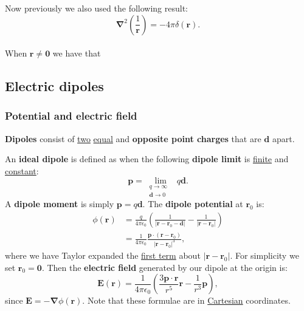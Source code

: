 \documentclass{article}
\begin{document}
Now previously we also used the following result:
$$\boldsymbol{\nabla}^2
\left(\frac{1}{\boldsymbol{r}}\right)
=-4\pi\delta(\boldsymbol{r}).$$ \\

When $\boldsymbol{r}\neq\boldsymbol{0}$ we have that



\newpage

\subsection{Electric dipoles}

\subsubsection{Potential and electric field}
\textbf{Dipoles} consist of \underline{two} \underline{equal} and \textbf{opposite point charges} that are $\boldsymbol{d}$ apart. 

An \textbf{ideal dipole} is defined as when the following \textbf{dipole limit} is \underline{finite} and \underline{constant}:
$$\boldsymbol{p}=\lim_{\begin{smallmatrix} q\to\infty & \\ \boldsymbol{d}\to 0 \end{smallmatrix}} q\boldsymbol{d}.$$
A \textbf{dipole moment} is simply $\boldsymbol{p}=q\boldsymbol{d}$. The \textbf{dipole potential} at $\boldsymbol{r}_0$ is:
\begin{align*}
    \phi(\boldsymbol{r})
    &= \frac{q}{4\pi\epsilon_0}\left(\frac{1}{|\boldsymbol{r}-\boldsymbol{r}_0-\boldsymbol{d}|}-\frac{1}{|\boldsymbol{r}-\boldsymbol{r}_0|}\right)\\
    &=\frac{1}{4\pi\epsilon_0}\frac{\boldsymbol{p}\cdot(\boldsymbol{r}-\boldsymbol{r}_0)}{|\boldsymbol{r}-\boldsymbol{r}_0|^3},
\end{align*}
where we have Taylor expanded the \underline{first term} about $|\boldsymbol{r}-\boldsymbol{r}_0|$. For simplicity we set $\boldsymbol{r}_0=\boldsymbol{0}$. Then the \textbf{electric field} generated by our dipole at the origin is:
$$\boldsymbol{E}(\boldsymbol{r})=\frac{1}{4\pi\epsilon_0}\left(\frac{3\boldsymbol{p}\cdot\boldsymbol{r}}{r^5} \boldsymbol{r}-\frac{1}{r^3} \boldsymbol{p}\right),$$
since $\boldsymbol{E}=-\boldsymbol{\nabla}\phi(\boldsymbol{r})$. Note that these formulae are in \underline{Cartesian} coordinates.
\end{document}
